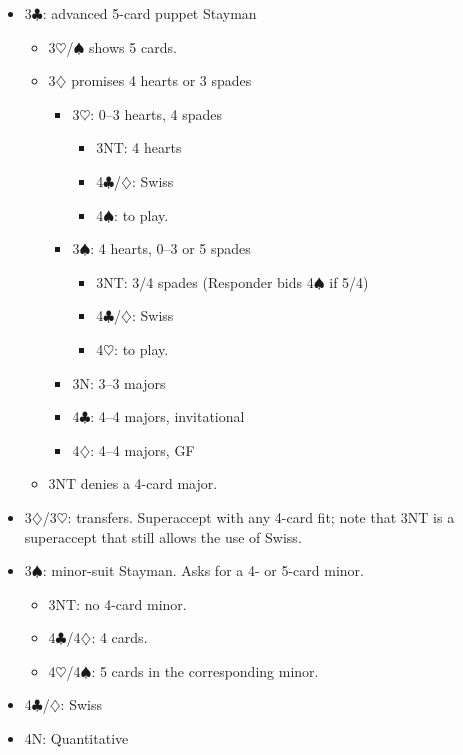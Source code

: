 \documentclass[a4paper,12pt]{article}
\begin{document}
\begin{itemize}
\item 3$\clubsuit$: advanced 5-card puppet Stayman
	\begin{itemize}
   \item 3$\heartsuit$/$\spadesuit$ shows 5 cards.
   \item 3$\diamondsuit$ promises 4 hearts or 3 spades
		\begin{itemize}
      \item 3$\heartsuit$: 0--3 hearts, 4 spades
			\begin{itemize}
         \item 3NT: 4 hearts
         \item 4$\clubsuit$/$\diamondsuit$: Swiss
         \item 4$\spadesuit$: to play.
			\end{itemize}
      \item 3$\spadesuit$: 4 hearts, 0--3 or 5 spades
			\begin{itemize}
         \item 3NT: 3/4 spades (Responder bids 4$\spadesuit$ if 5/4)
         \item 4$\clubsuit$/$\diamondsuit$: Swiss
         \item 4$\heartsuit$: to play.
			\end{itemize}
      \item 3N: 3--3 majors
      \item 4$\clubsuit$: 4--4 majors, invitational
      \item 4$\diamondsuit$: 4--4 majors, GF
		\end{itemize}
   \item 3NT denies a 4-card major.
	\end{itemize}

\item 3$\diamondsuit$/3$\heartsuit$: transfers.  Superaccept with any 4-card fit; note that 3NT is a
superaccept that still allows the use of Swiss.

\item 3$\spadesuit$: minor-suit Stayman.  Asks for a 4- or 5-card minor.
	\begin{itemize}
   \item 3NT: no 4-card minor.
   \item 4$\clubsuit$/4$\diamondsuit$: 4 cards.
   \item 4$\heartsuit$/4$\spadesuit$: 5 cards in the corresponding minor.
	\end{itemize}

\item 4$\clubsuit$/$\diamondsuit$: Swiss
\item 4N: Quantitative
\end{itemize}
\end{document}
